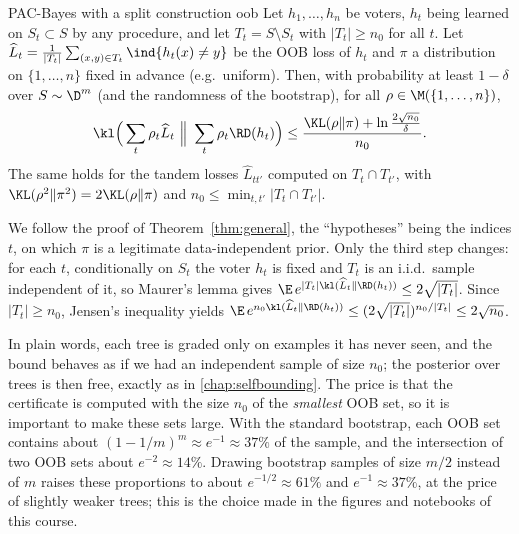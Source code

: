 \begin{theorem}{PAC-Bayes with a split construction \citep{thiemann2017strongly,lorenzen2019pac}}{oob}
Let $h_1,\dots,h_n$ be voters, $h_t$ being learned on $S_t\subset S$ by any
procedure, and let $T_t=S\setminus S_t$ with $|T_t|\geq n_0$ for all $t$. Let
$\widehat L_t=\frac{1}{|T_t|}\sum_{(x,y)\in T_t}\ind{h_t(x)\neq y}$ be the OOB
loss of $h_t$ and $\pi$ a distribution on $\{1,\dots,n\}$ fixed in advance
(e.g.\ uniform). Then, with probability at least $1-\delta$ over $S\sim\D^m$ (and the
randomness of the bootstrap), for all $\rho\in\M(\{1,\dots,n\})$,
\begin{equation}\label{eq:oob}
\kl\Big(\sum_t\rho_t\widehat L_t\ \Big\|\ \sum_t\rho_t\RD(h_t)\Big)\leq\frac{\KL(\rho\|\pi)+\ln\frac{2\sqrt{n_0}}{\delta}}{n_0}.
\end{equation}
The same holds for the tandem losses $\widehat L_{tt'}$ computed on $T_t\cap T_{t'}$,
with $\KL(\rho^2\|\pi^2)=2\KL(\rho\|\pi)$ and $n_0\leq\min_{t,t'}|T_t\cap T_{t'}|$.
\end{theorem}

\begin{proofsketch}
We follow the proof of Theorem~\ref{thm:general}, the ``hypotheses'' being the
indices $t$, on which $\pi$ is a legitimate data-independent prior. Only the
third step changes: for each $t$, conditionally on $S_t$ the voter $h_t$ is fixed
and $T_t$ is an i.i.d.\ sample independent of it, so Maurer's lemma gives
$\E\,e^{|T_t|\kl(\widehat L_t\|\RD(h_t))}\leq2\sqrt{|T_t|}$. Since $|T_t|\geq n_0$,
Jensen's inequality yields $\E\,e^{n_0\kl(\widehat L_t\|\RD(h_t))}\leq(2\sqrt{|T_t|})^{n_0/|T_t|}\leq2\sqrt{n_0}$.
\end{proofsketch}

In plain words, each tree is graded only on examples it has never seen, and the
bound behaves as if we had an independent sample of size $n_0$; the posterior
over trees is then free, exactly as in \cref{chap:selfbounding}. The price is
that the certificate is computed with the size $n_0$ of the \emph{smallest} OOB set,
so it is important to make these sets large. With the standard bootstrap, each
OOB set contains about $(1-1/m)^m\approx e^{-1}\approx37\%$ of the sample, and the
intersection of two OOB sets about $e^{-2}\approx14\%$. Drawing bootstrap samples
of size $m/2$ instead of $m$ raises these proportions to about
$e^{-1/2}\approx61\%$ and $e^{-1}\approx37\%$, at the price of slightly weaker
trees; this is the choice made in the figures and notebooks of this course.


